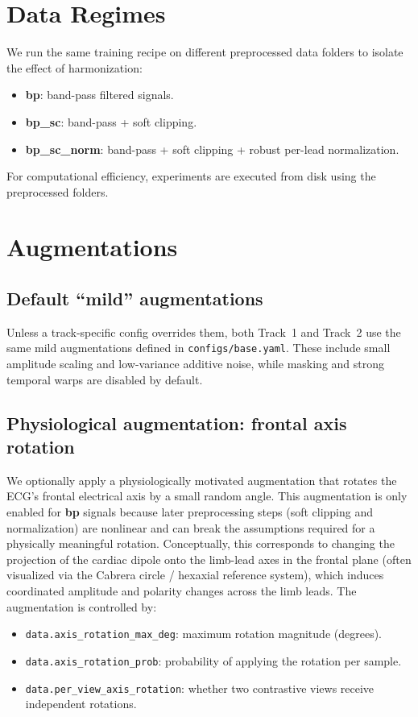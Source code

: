 \section{Data Regimes}
We run the same training recipe on different preprocessed data folders to isolate the effect of harmonization:
\begin{itemize}
  \item \textbf{bp}: band-pass filtered signals.
  \item \textbf{bp\_sc}: band-pass + soft clipping.
  \item \textbf{bp\_sc\_norm}: band-pass + soft clipping + robust per-lead normalization.
\end{itemize}
For computational efficiency, experiments are executed from disk using the preprocessed folders.

\section{Augmentations}
\subsection{Default ``mild'' augmentations}
Unless a track-specific config overrides them, both Track~1 and Track~2 use the same mild augmentations defined in \texttt{configs/base.yaml}. These include small amplitude scaling and low-variance additive noise, while masking and strong temporal warps are disabled by default.

\subsection{Physiological augmentation: frontal axis rotation}
We optionally apply a physiologically motivated augmentation that rotates the ECG's frontal electrical axis by a small random angle. This augmentation is only enabled for \textbf{bp} signals because later preprocessing steps (soft clipping and normalization) are nonlinear and can break the assumptions required for a physically meaningful rotation.
Conceptually, this corresponds to changing the projection of the cardiac dipole onto the limb-lead axes in the frontal plane (often visualized via the Cabrera circle / hexaxial reference system), which induces coordinated amplitude and polarity changes across the limb leads.
The augmentation is controlled by:
\begin{itemize}
  \item \texttt{data.axis\_rotation\_max\_deg}: maximum rotation magnitude (degrees).
  \item \texttt{data.axis\_rotation\_prob}: probability of applying the rotation per sample.
  \item \texttt{data.per\_view\_axis\_rotation}: whether two contrastive views receive independent rotations.
\end{itemize}

